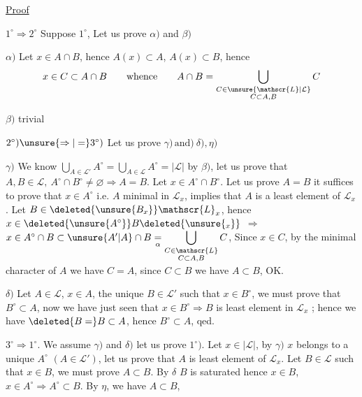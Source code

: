 \uline{Proof}

$1^\circ\Rightarrow 2^\circ$ \quad Suppose $1^\circ$, Let us prove $\alpha)$ and $\beta)$

$\alpha)$ Let $x\in A\cap B$, hence $A(x)\subset A$, $A(x)\subset B$, hence
\[
 x\in C\subset A\cap B\qquad\text{whence}\qquad A\cap B=
 \bigcup_{\substack{C\in\unsure{\mathscr{L}|\mathcal{L}}\\C\subset A,B}}C
\]

$\beta)$ trivial

$2^\circ)\unsure{\Rightarrow|=}3^\circ)$ \quad Let us prove $\gamma)\,\text{and})\ \delta),\eta)$

$\gamma)$ We know $\displaystyle\bigcup_{A\in\mathscr{L}'}A^\circ=\bigcup_{A\in\mathscr{L}}A^\circ=|\mathscr{L}|$ by $\beta)$, let us prove that $A,B\in\mathscr{L},\ A^\circ\cap B^\circ\ne\varnothing\Rightarrow A=B$. Let $x\in A^\circ\cap B^\circ$. Let us prove $A=B$ it suffices to prove that $x\in A^\circ$  i.e. $A$ minimal in $\mathscr{L}_x$, implies that $A$ is a least element of $\mathscr{L}_x$. Let $B\in\deleted{\unsure{B_x}}\mathscr{L}_x$, hence $x\in\deleted{\unsure{A^\circ}}B\deleted{\unsure{{}_x}}$  $\Rightarrow$ $x\in A^\circ\cap B\subset\unsure{A'|A}\cap B\underset{\alpha}{=}\displaystyle\bigcup_{\substack{C\in\mathscr{L}\\C\subset A,B}} C$,
Since $x\in C$, by the minimal character of $A$ we have $C=A$, since $C\subset B$ we have $A\subset B$, OK.

$\delta)$ Let $A\in\mathscr{L}$, $x\in A$,    the unique $B\in\mathscr{L}'$ such that $x\in B^\circ$, we must prove that $B^\circ\subset A$, now we have just seen that  $x\in B^\circ\Rightarrow B$ is least element in $\mathscr{L}_x$ ; hence we have $\deleted{B=}B\subset A$, hence $B^\circ\subset A$, qed.


$3^\circ\Rightarrow1^\circ$. \quad We assume $\gamma)$ and $\delta)$ let us prove $1^\circ)$. Let $x\in|\mathscr{L}|$, by $\gamma)$ $x$ belongs to a unique $A^\circ$  $(A\in\mathscr{L}')$, let us prove that $A$ is least element of $\mathscr{L}_x$. Let $B\in\mathscr{L}$ such that $x\in B$, we must prove $A\subset B$.  By $\delta$ $B$ is saturated hence $x\in B$, $x\in A^\circ\Rightarrow A^\circ\subset B$.  By $\eta$, we have $A\subset B$,
